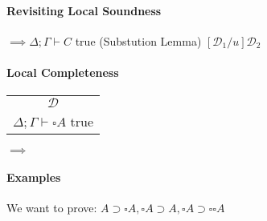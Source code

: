 \documentclass[12 pt]{article}
\begin{document}
       \paragraph{Revisiting Local Soundness}
       \begin{center}
         \noLine
         \noLine
         \DP
         $\implies \Delta; \Gamma \vdash C$ true (Substution Lemma) $[\mathcal{D}_1/u]\mathcal{D_2}$
       \end{center}
       \paragraph{Local Completeness}
       \begin{center}
         \begin{tabular}{c}
           $\mathcal{D}$
           \\ $\Delta; \Gamma \vdash \square A$ true
         \end{tabular}
         $\implies$
         \noLine
         \DP
       \end{center}
       \paragraph{Examples}
       We want to prove: $A \supset \square A, \square A
       \supset A, \square A \supset \square \square A$
       
\end{document}
